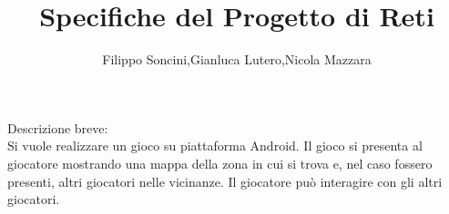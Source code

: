 \documentclass[a4paper,12pt]{article}
\title{Specifiche del Progetto di Reti}
\author{Filippo Soncini,Gianluca Lutero,Nicola Mazzara}
\begin{document}
\maketitle

Descrizione breve: \\

Si vuole realizzare un gioco su piattaforma Android. Il gioco si presenta al giocatore mostrando una mappa della zona in cui si trova e, nel caso fossero presenti, altri giocatori nelle vicinanze. Il giocatore può interagire con gli altri giocatori.  
\end{document}
